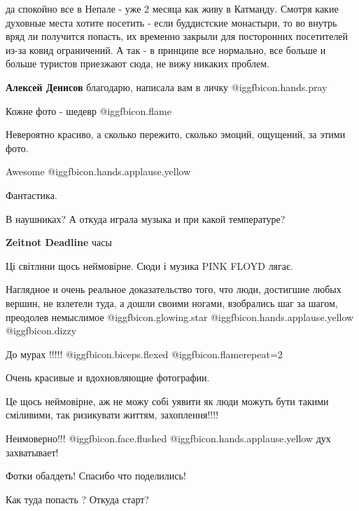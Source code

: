\begin{itemize}
\begin{itemize}
да спокойно все в Непале - уже 2 месяца как живу в Катманду. Смотря какие
духовные места хотите посетить - если буддистские монастыри, то во внутрь вряд
ли получится попасть, их временно закрыли для посторонних посетителей из-за
ковид ограничений. А так - в принципе все нормально, все больше и больше
туристов приезжают сюда, не вижу никаких проблем.

\textbf{Алексей Денисов} благодарю, написала вам в личку  @igg{fbicon.hands.pray} 
\end{itemize} %

Кожне фото - шедевр  @igg{fbicon.flame} 

Невероятно красиво, а сколько пережито, сколько эмоций, ощущений, за этими фото.

Awesome  @igg{fbicon.hands.applause.yellow} 

Фантастика.

В наушниках? А откуда играла музыка и при какой температуре?

\begin{itemize} %
\textbf{Zeitnot Deadline} часы
\end{itemize} %

Ці світлини щось неймовірне. Сюди і музика PINK FLOYD лягає.

Наглядное и очень реальное доказательство того, что люди, достигшие любых вершин, не взлетели туда, а дошли своими ногами, взобрались шаг за шагом, преодолев немыслимое  @igg{fbicon.glowing.star}  @igg{fbicon.hands.applause.yellow}  @igg{fbicon.dizzy} 

До мурах !!!!! @igg{fbicon.biceps.flexed}  @igg{fbicon.flame}{repeat=2} 

Очень красивые и вдохновляющие фотографии.

Це щось неймовірне, аж не можу собі уявити як люди можуть бути такими сміливими, так ризикувати життям, захоплення!!!!

Неимоверно!!! @igg{fbicon.face.flushed}  @igg{fbicon.hands.applause.yellow}  дух захватывает!

Фотки обалдеть! Спасибо что поделились!

Как туда попасть ? Откуда старт?


\end{itemize}
